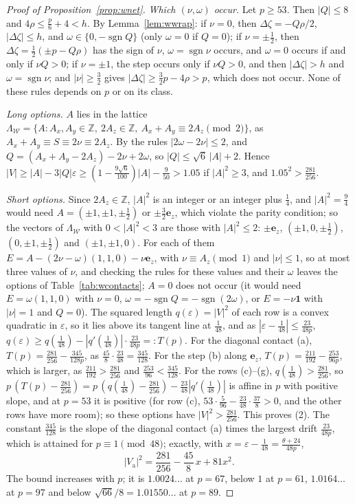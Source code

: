 \documentclass[11pt]{amsart}
\theoremstyle{definition}
\theoremstyle{plain}
\newcommand{\Z}{\mathbb{Z}}
\newcommand{\e}{\mathbf{e}}
\DeclareMathOperator{\sgn}{sgn}
\begin{document}
\begin{proof}[Proof of Proposition~\ref{prop:wnet}]
\emph{Which $(\nu,\omega)$ occur.} Let $p\ge53$. Then $|Q|\le8$ and $4\rho\le\frac p6+4<h$. By Lemma~\ref{lem:wwrap}: if $\nu=0$, then $\Delta\zeta=-Q\rho/2$, $|\Delta\zeta|\le h$, and $\omega\in\{0,-\sgn Q\}$ (only $\omega=0$ if $Q=0$); if $\nu=\pm\frac12$, then $\Delta\zeta=\frac12(\pm p-Q\rho)$ has the sign of $\nu$, $\omega=\sgn \nu$ occurs, and $\omega=0$ occurs if and only if $\nu Q>0$; if $\nu=\pm1$, the step occurs only if $\nu Q>0$, and then $|\Delta\zeta|>h$ and $\omega=\sgn \nu$; and $|\nu|\ge\frac32$ gives $|\Delta\zeta|\ge\frac32p-4\rho>p$, which does not occur. None of these rules depends on $p$ or on its class.

\emph{Long options.} $A$ lies in the lattice $\Lambda_{\mathcal W}=\{A:A_x,A_y\in\Z,\ 2A_z\in\Z,\ A_x+A_y\equiv2A_z\pmod2\}$, as $A_x+A_y\equiv S\equiv2\nu\equiv2A_z$. By the rules $|2\omega-2\nu|\le2$, and $Q=(A_x+A_y-2A_z)-2\nu+2\omega$, so $|Q|\le\sqrt6\,|A|+2$. Hence $|V|\ge|A|-3|Q|\varepsilon\ge(1-\frac{9\sqrt6}{100})|A|-\frac9{50}>1.05$ if $|A|^2\ge3$, and $1.05^2>\frac{281}{256}$.

\emph{Short options.} Since $2A_z\in\Z$, $|A|^2$ is an integer or an integer plus $\frac14$, and $|A|^2=\frac94$ would need $A=(\pm1,\pm1,\pm\frac12)$ or $\pm\frac32\e_z$, which violate the parity condition; so the vectors of $\Lambda_{\mathcal W}$ with $0<|A|^2<3$ are those with $|A|^2\le2$: $\pm\e_z$, $(\pm1,0,\pm\frac12)$, $(0,\pm1,\pm\frac12)$ and $(\pm1,\pm1,0)$. For each of them $E=A-(2\nu-\omega)(1,1,0)-\nu\e_z$, with $\nu\equiv A_z\pmod1$ and $|\nu|\le1$, so at most three values of $\nu$, and checking the rules for these values and their $\omega$ leaves the options of Table~\ref{tab:wcontacts}; $A=0$ does not occur (it would need $E=\omega(1,1,0)$ with $\nu=0$, $\omega=-\sgn Q=-\sgn(2\omega)$, or $E=-\nu\mathbf 1$ with $|\nu|=1$ and $Q=0$). The squared length $q(\varepsilon)=|V|^2$ of each row is a convex quadratic in $\varepsilon$, so it lies above its tangent line at $\frac1{48}$, and as $|\varepsilon-\frac1{48}|\le\frac{23}{48p}$, $q(\varepsilon)\ge q(\frac1{48})-|q'(\frac1{48})|\cdot\frac{23}{48p}=:T(p)$. For the diagonal contact (a), $T(p)=\frac{281}{256}-\frac{345}{128p}$, as $\frac{45}8\cdot\frac{23}{48}=\frac{345}{128}$. For the step (b) along $\e_z$, $T(p)=\frac{211}{192}-\frac{253}{96p}$, which is larger, as $\frac{211}{192}>\frac{281}{256}$ and $\frac{253}{96}<\frac{345}{128}$. For the rows (c)--(g), $q(\frac1{48})>\frac{281}{256}$, so $p\,(T(p)-\frac{281}{256})=p\,(q(\frac1{48})-\frac{281}{256})-\frac{23}{48}|q'(\frac1{48})|$ is affine in $p$ with positive slope, and at $p=53$ it is positive (for row (c), $53\cdot\frac5{96}-\frac{23}{48}\cdot\frac{37}8>0$, and the other rows have more room); so these options have $|V|^2>\frac{281}{256}$. This proves (2). The constant $\frac{345}{128}$ is the slope of the diagonal contact (a) times the largest drift $\frac{23}{48p}$, which is attained for $p\equiv1\pmod{48}$; exactly, with $x=\varepsilon-\frac1{48}=\frac{\theta+24}{48p}$,
\[
|V_{\mathrm a}|^2=\frac{281}{256}-\frac{45}8\,x+81x^2 .
\] The bound increases with $p$; it is $1.0024\ldots$ at $p=67$, below $1$ at $p=61$, $1.0164\ldots$ at $p=97$ and below $\sqrt{66}/8=1.01550\ldots$ at $p=89$.


\end{proof}
\end{document}
